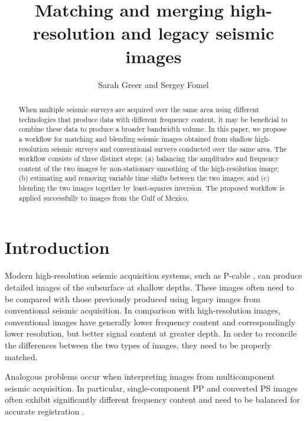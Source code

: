 
\title{Matching and merging high-resolution and legacy seismic images}
\author{Sarah Greer and Sergey Fomel}

\maketitle

\begin{abstract}
When multiple seismic surveys are acquired over the same area using different technologies that produce data with different frequency content, it may be beneficial to combine these data to produce a broader bandwidth volume.
In this paper, we propose a workflow for matching and blending seismic images obtained from shallow high-resolution seismic surveys and conventional surveys conducted over the same area.
The workflow consists of three distinct steps:
(a) balancing the amplitudes and frequency content of the two images by non-stationary smoothing of the high-resolution image;
(b) estimating and removing variable time shifts between the two images; and
(c) blending the two images together by least-squares inversion.
The proposed workflow is applied successfully to images from the Gulf of Mexico.

\end{abstract}

\section{Introduction}

Modern high-resolution seismic acquisition systems, such as P-cable \cite[]{pcable,tip}, can produce detailed images of the subsurface at shallow depths.
These images often need to be compared with those previously produced using legacy images from conventional seismic acquisition.
In comparison with high-resolution images, conventional images have generally lower frequency content and correspondingly lower resolution, but better signal content at greater depth.
In order to reconcile the differences between the two types of images, they need to be properly matched.

Analogous problems occur when interpreting images from multicomponent seismic acquisition.
In particular, single-component PP and converted PS images often exhibit significantly different frequency content and need to be balanced for accurate registration \cite[]{hardage,SEG-2003-07810784,warp}.

